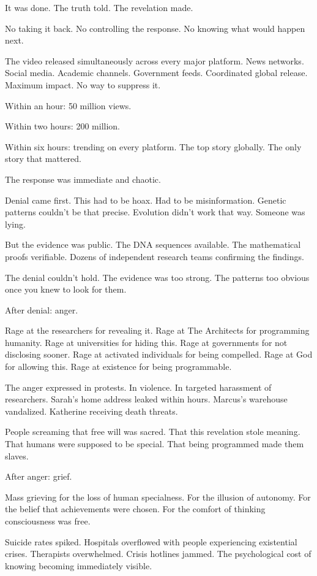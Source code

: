 It was done. The truth told. The revelation made.

No taking it back. No controlling the response. No knowing what would happen next.

\scenebreak

The video released simultaneously across every major platform. News networks. Social media. Academic channels. Government feeds. Coordinated global release. Maximum impact. No way to suppress it.

Within an hour: 50 million views.

Within two hours: 200 million.

Within six hours: trending on every platform. The top story globally. The only story that mattered.

The response was immediate and chaotic.

Denial came first. This had to be hoax. Had to be misinformation. Genetic patterns couldn't be that precise. Evolution didn't work that way. Someone was lying.

But the evidence was public. The DNA sequences available. The mathematical proofs verifiable. Dozens of independent research teams confirming the findings.

The denial couldn't hold. The evidence was too strong. The patterns too obvious once you knew to look for them.

After denial: anger.

Rage at the researchers for revealing it. Rage at The Architects for programming humanity. Rage at universities for hiding this. Rage at governments for not disclosing sooner. Rage at activated individuals for being compelled. Rage at God for allowing this. Rage at existence for being programmable.

The anger expressed in protests. In violence. In targeted harassment of researchers. Sarah's home address leaked within hours. Marcus's warehouse vandalized. Katherine receiving death threats.

People screaming that free will was sacred. That this revelation stole meaning. That humans were supposed to be special. That being programmed made them slaves.

After anger: grief.

Mass grieving for the loss of human specialness. For the illusion of autonomy. For the belief that achievements were chosen. For the comfort of thinking consciousness was free.

Suicide rates spiked. Hospitals overflowed with people experiencing existential crises. Therapists overwhelmed. Crisis hotlines jammed. The psychological cost of knowing becoming immediately visible.

